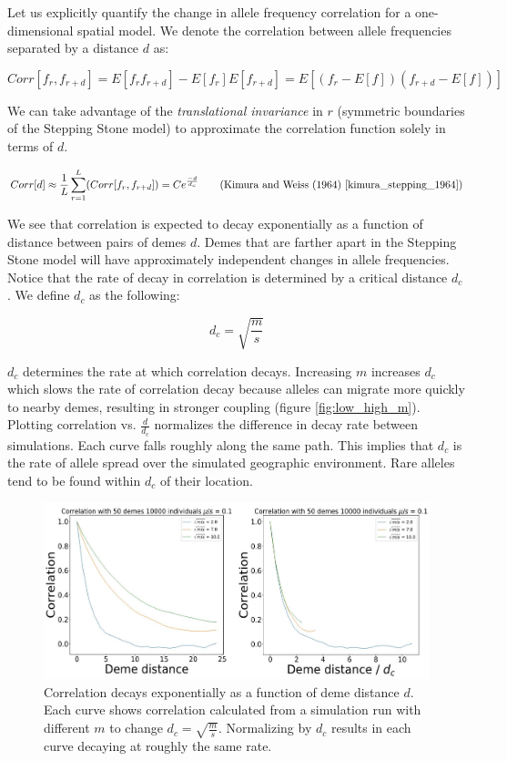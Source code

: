 Let us explicitly quantify the change in allele frequency correlation for a one-dimensional spatial model. We denote the correlation between allele frequencies separated by a distance $d$ as:

\begin{equation}
    Corr[f_r,f_{r+d}] = E[f_r f_{r+d}] - E[f_r] E[f_{r+d}] = E[(f_r - E[f])(f_{r+d} - E[f])]
\end{equation}

We can take advantage of the \textit{translational invariance} in $r$ (symmetric boundaries of the Stepping Stone model) to approximate the correlation function solely in terms of $d$.

\begin{equation}
    Corr[d] \approx \frac{1}{L} \sum_{r=1}^L (Corr[f_r,f_{r+d}]) = Ce^{\frac{-d}{d_c}} \tag{Kimura and Weiss (1964) \cite{kimura_stepping_1964}}
\end{equation}

We see that correlation is expected to decay exponentially as a function of distance between pairs of demes $d$. Demes that are farther apart in the Stepping Stone model will have approximately independent changes in allele frequencies. Notice that the rate of decay in correlation is determined by a critical distance $d_c$. We define $d_c$ as the following:

\begin{equation}
    d_c = \sqrt{\frac{m}{s}}
\end{equation}


$d_c$ determines the rate at which correlation decays. Increasing $m$ increases $d_c$ which slows the rate of correlation decay because alleles can migrate more quickly to nearby demes, resulting in stronger coupling (figure \ref{fig:low_high_m}). Plotting correlation vs. $\frac{d}{d_c}$ normalizes the difference in decay rate between simulations. Each curve falls roughly along the same path. This implies that $d_c$ is the rate of allele spread over the simulated geographic environment. Rare alleles tend to be found within $d_c$ of their location.


\begin{figure}[H]
    \centering
    \includegraphics[scale=0.5]{img/correlation_curve.JPG}
    \caption{Correlation decays exponentially as a function of deme distance $d$. Each curve shows correlation calculated from a simulation run with different $m$ to change $d_c = \sqrt{\frac{m}{s}}$. Normalizing by $d_c$ results in each curve decaying at roughly the same rate.}
    \label{fig:correlation}
\end{figure}


